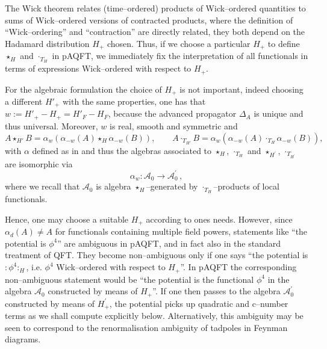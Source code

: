 \documentclass[10pt]{book}
\newcommand{\wick}[1]{:\!{#1}\!:}
\newcommand{\Acal}{\mathcal{A}}
\theoremstyle{break}
\begin{document}
The Wick theorem relates (time--ordered) products of Wick--ordered quantities to sums of Wick--ordered versions of contracted products, where the definition of ``Wick--ordering'' and ``contraction'' are directly related, they both depend on the Hadamard distribution  $H_+$ chosen. Thus, if we choose a particular $H_+$ to define $\star_H$ and $\cdot_{T_H}$ in pAQFT, we immediately fix the interpretation of all functionals in terms of expressions Wick--ordered with respect to $H_+$.

For the algebraic formulation the choice of $H_+$ is not important, indeed choosing a different $H'_+$ with the same properties, one has that $w:=H'_+-H_+=H'_F-H_F$, because the advanced propagator $\Delta_A$ is unique and thus universal. Moreover, $w$ is real, smooth and symmetric and
$$A\star_{H'}B=\alpha_w\left(\alpha_{-w}(A)\star_H\alpha_{-w}(B)\right),\qquad A\cdot_{T_{H'}}B=\alpha_w\left(\alpha_{-w}(A)\cdot_{T_H}\alpha_{-w}(B)\right),$$
with $\alpha$ defined as in %
and thus the algebras associated to $\star_H$, $\cdot_{T_H}$ and  $\star_{H^\prime}$, $\cdot_{T_{H^\prime}}$ are isomorphic via $$\alpha_{w}:\Acal_0\to \Acal^\prime_0\,,$$ where we recall that $\Acal_0$ is algebra $\star_H$--generated by $\cdot_{T_H}$--products of local functionals.

Hence, one may choose a suitable $H_+$ according to ones needs. However, since $\alpha_{d}(A)\neq A$ for functionals containing multiple field powers, statements like ``the potential is $\phi^4$'' are ambiguous in pAQFT, and in fact also in the standard treatment of QFT. They become non--ambiguous only if one says ``the potential is $\wick{\phi^4}_H$, i.e.  $\phi^4$ Wick--ordered with respect to $H_+$''. In pAQFT the corresponding non--ambiguous statement would be ``the potential is the functional $\phi^4$ in the algebra $\Acal_0$ constructed by means of $H_+$''. If one then passes to the algebra $\Acal^\prime_0$ constructed by means of $H^\prime_+$, the potential picks up quadratic and c--number terms as we shall compute explicitly below. Alternatively, this ambiguity may be seen to correspond to the renormalisation ambiguity of tadpoles in Feynman diagrams.
\end{document}
